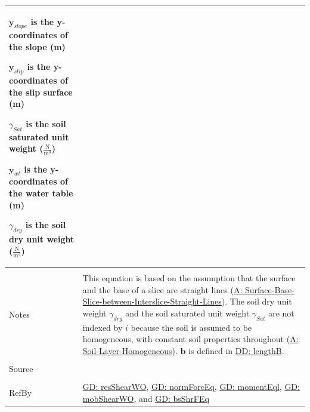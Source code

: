 \documentclass[12pt]{article}
\begin{document}
\begin{minipage}{\textwidth}
\begin{tabular}{>{\raggedright}p{}>{\raggedright\arraybackslash}p{}}
\begin{symbDescription}
                        \item{${\mathbf{y}_{slope}}$ is the y-coordinates of the slope (m)}
                        \item{${\mathbf{y}_{slip}}$ is the y-coordinates of the slip surface (m)}
                        \item{${γ_{Sat}}$ is the soil saturated unit weight ($\frac{\text{N}}{\text{m}^{3}}$)}
                        \item{${\mathbf{y}_{wt}}$ is the y-coordinates of the water table (m)}
                        \item{${γ_{dry}}$ is the soil dry unit weight ($\frac{\text{N}}{\text{m}^{3}}$)}
                        \end{symbDescription}
          \\ \midrule \\
          Notes & This equation is based on the assumption that the surface and the base of a slice are straight lines (\hyperref[assumpSBSBISL]{A: Surface-Base-Slice-between-Interslice-Straight-Lines}). The soil dry unit weight ${γ_{dry}}$ and the soil saturated unit weight ${γ_{Sat}}$ are not indexed by $i$ because the soil is assumed to be homogeneous, with constant soil properties throughout (\hyperref[assumpSLH]{A: Soil-Layer-Homogeneous}). $\mathbf{b}$ is defined in \hyperref[DD:lengthB]{DD: lengthB}.
          \\ \midrule \\
          Source & \cite{fredlund1977}
          \\ \midrule \\
          RefBy & \hyperref[GD:resShearWO]{GD: resShearWO}, \hyperref[GD:normForcEq]{GD: normForcEq}, \hyperref[GD:momentEql]{GD: momentEql}, \hyperref[GD:mobShearWO]{GD: mobShearWO}, and \hyperref[GD:bsShrFEq]{GD: bsShrFEq}
          \\ \bottomrule
          \end{tabular}
          \end{minipage}
\end{document}
